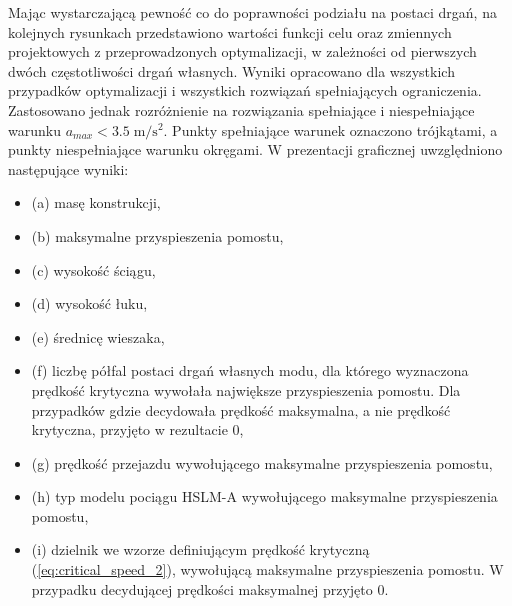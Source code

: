 Mając wystarczającą pewność co do poprawności podziału na postaci drgań, na kolejnych rysunkach przedstawiono wartości funkcji celu oraz zmiennych projektowych z przeprowadzonych optymalizacji, w zależności od pierwszych dwóch częstotliwości drgań własnych.
Wyniki opracowano dla wszystkich przypadków optymalizacji i wszystkich rozwiązań spełniających ograniczenia. Zastosowano jednak rozróżnienie na rozwiązania spełniające i niespełniające warunku $a_{max}<3.5\;\mathrm{m/s^2}$. Punkty spełniające warunek oznaczono trójkątami, a punkty niespełniające warunku okręgami. W prezentacji graficznej uwzględniono następujące wyniki:
\begin{itemize}
	\item (a) masę konstrukcji,
	\item (b) maksymalne przyspieszenia pomostu,
	\item (c) wysokość ściągu,
	\item (d) wysokość łuku,
	\item (e) średnicę wieszaka,
	\item (f) liczbę półfal postaci drgań własnych modu, dla którego wyznaczona prędkość krytyczna wywołała największe przyspieszenia pomostu. Dla przypadków gdzie decydowała prędkość maksymalna, a nie prędkość krytyczna, przyjęto w rezultacie 0,
	\item (g) prędkość przejazdu wywołującego maksymalne przyspieszenia pomostu,
	\item (h) typ modelu pociągu HSLM-A wywołującego maksymalne przyspieszenia pomostu,
	\item (i) dzielnik we wzorze definiującym prędkość krytyczną (\ref{eq:critical_speed_2}), wywołującą maksymalne przyspieszenia pomostu. W przypadku decydującej prędkości maksymalnej przyjęto 0.
\end{itemize}

